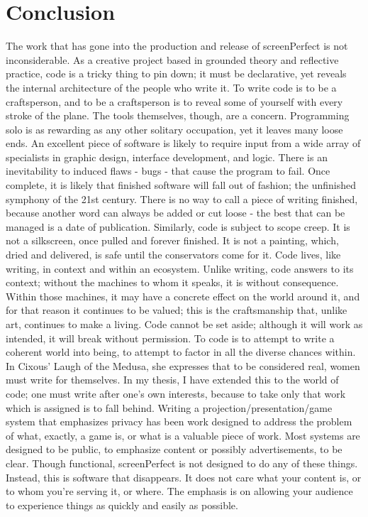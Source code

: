 \section{Conclusion}
The work that has gone into the production and release of screenPerfect is not inconsiderable. As a creative project based in grounded theory and reflective practice, code is a tricky thing to pin down; it must be declarative, yet reveals the internal architecture of the people who write it. To write code is to be a craftsperson, and to be a craftsperson is to reveal some of yourself with every stroke of the plane. 
The tools themselves, though, are a concern. Programming solo is as rewarding as any other solitary occupation, yet it leaves many loose ends. An excellent piece of software is likely to require input from a wide array of specialists in graphic design, interface development, and logic. There is an inevitability to induced flaws - bugs - that cause the program to fail. Once complete, it is likely that finished software will fall out of fashion; the unfinished symphony of the 21st century. There is no way to call a piece of writing finished, because another word can always be added or cut loose - the best that can be managed is a date of publication. Similarly, code is subject to scope creep. It is not a silkscreen, once pulled and forever finished. It is not a painting, which, dried and delivered, is safe until the conservators come for it. Code lives, like writing, in context and within an ecosystem.
Unlike writing, code answers to its context; without the machines to whom it speaks, it is without consequence. Within those machines, it may have a concrete effect on the world around it, and for that reason it continues to be valued; this is the craftsmanship that, unlike art, continues to make a living. Code cannot be set aside; although it will work as intended, it will break without permission. To code is to attempt to write a coherent world into being, to attempt to factor in all the diverse chances within.
In Cixous’ Laugh of the Medusa, she expresses that to be considered real, women must write for themselves. In my thesis, I have extended this to the world of code; one must write after one’s own interests, because to take only that work which is assigned is to fall behind. Writing a projection/presentation/game system that emphasizes privacy has been work designed to address the problem of what, exactly, a game is, or what is a valuable piece of work. Most systems are designed to be public, to emphasize content or possibly advertisements, to be clear. Though functional, screenPerfect is not designed to do any of these things. Instead, this is software that disappears. It does not care what your content is, or to whom you’re serving it, or where. The emphasis is on allowing your audience to experience things as quickly and easily as possible.
